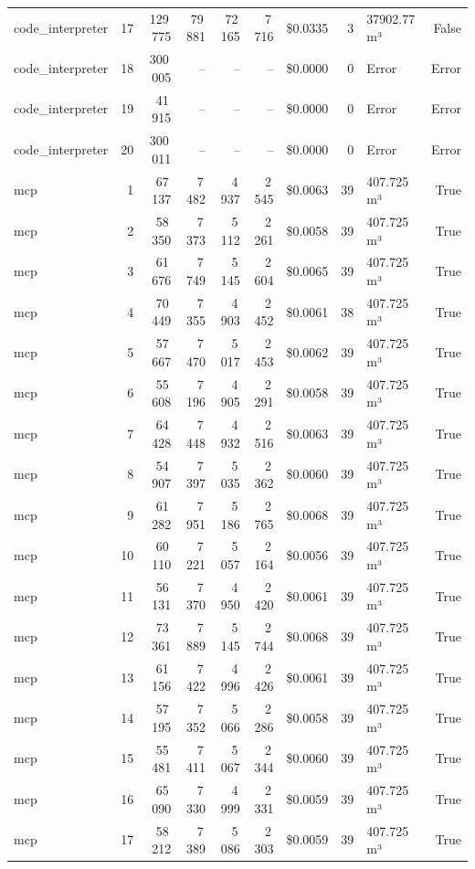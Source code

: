 \documentclass[a4paper,11pt]{article}
\begin{document}
\begin{table}[H]
{\begin{tabular}{l r r r r r r r l r}
code\_interpreter & 17 & 129\,775 & 79\,881 & 72\,165 & 7\,716 & \$0.0335 & 3 & 37902.77 m³ & False \\
code\_interpreter & 18 & 300\,005 & -- & -- & -- & \$0.0000 & 0 & Error & Error \\
code\_interpreter & 19 & 41\,915 & -- & -- & -- & \$0.0000 & 0 & Error & Error \\
code\_interpreter & 20 & 300\,011 & -- & -- & -- & \$0.0000 & 0 & Error & Error \\
\midrule
mcp & 1 & 67\,137 & 7\,482 & 4\,937 & 2\,545 & \$0.0063 & 39 & 407.725 m³ & True \\
mcp & 2 & 58\,350 & 7\,373 & 5\,112 & 2\,261 & \$0.0058 & 39 & 407.725 m³ & True \\
mcp & 3 & 61\,676 & 7\,749 & 5\,145 & 2\,604 & \$0.0065 & 39 & 407.725 m³ & True \\
mcp & 4 & 70\,449 & 7\,355 & 4\,903 & 2\,452 & \$0.0061 & 38 & 407.725 m³ & True \\
mcp & 5 & 57\,667 & 7\,470 & 5\,017 & 2\,453 & \$0.0062 & 39 & 407.725 m³ & True \\
mcp & 6 & 55\,608 & 7\,196 & 4\,905 & 2\,291 & \$0.0058 & 39 & 407.725 m³ & True \\
mcp & 7 & 64\,428 & 7\,448 & 4\,932 & 2\,516 & \$0.0063 & 39 & 407.725 m³ & True \\
mcp & 8 & 54\,907 & 7\,397 & 5\,035 & 2\,362 & \$0.0060 & 39 & 407.725 m³ & True \\
mcp & 9 & 61\,282 & 7\,951 & 5\,186 & 2\,765 & \$0.0068 & 39 & 407.725 m³ & True \\
mcp & 10 & 60\,110 & 7\,221 & 5\,057 & 2\,164 & \$0.0056 & 39 & 407.725 m³ & True \\
mcp & 11 & 56\,131 & 7\,370 & 4\,950 & 2\,420 & \$0.0061 & 39 & 407.725 m³ & True \\
mcp & 12 & 73\,361 & 7\,889 & 5\,145 & 2\,744 & \$0.0068 & 39 & 407.725 m³ & True \\
mcp & 13 & 61\,156 & 7\,422 & 4\,996 & 2\,426 & \$0.0061 & 39 & 407.725 m³ & True \\
mcp & 14 & 57\,195 & 7\,352 & 5\,066 & 2\,286 & \$0.0058 & 39 & 407.725 m³ & True \\
mcp & 15 & 55\,481 & 7\,411 & 5\,067 & 2\,344 & \$0.0060 & 39 & 407.725 m³ & True \\
mcp & 16 & 65\,090 & 7\,330 & 4\,999 & 2\,331 & \$0.0059 & 39 & 407.725 m³ & True \\
mcp & 17 & 58\,212 & 7\,389 & 5\,086 & 2\,303 & \$0.0059 & 39 & 407.725 m³ & True \\

\end{tabular}}
\end{table}
\end{document}
